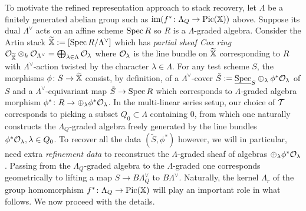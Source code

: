 \documentclass[12pt]{amsart}
\begin{document}
To motivate the refined representation approach to stack recovery, let $\Lambda$ be a finitely generated abelian group such as $\text{im} (f^* \colon \Lambda_Q \to \operatorname{Pic}(\mathbb{X}))$ above. Suppose its dual $\Lambda^{\vee}$ acts on an affine scheme $\operatorname{Spec} R$ so $R$ is a $\Lambda$-graded algebra. Consider the Artin stack $\widetilde{\mathbb{X}}:= [\operatorname{Spec} R/\Lambda^{\vee}]$ which has {\em partial sheaf Cox ring} $\mathcal{O}_{\widetilde{\mathbb{X}}} \otimes_k \mathcal{O}_{\Lambda^{\vee}} = \bigoplus_{\lambda \in \Lambda} \mathcal{O}_{\lambda}$ where $\mathcal{O}_{\lambda}$ is the line bundle on $\widetilde{\mathbb{X}}$ corresponding to $R$ with $\Lambda^{\vee}$-action twisted by the character $\lambda \in \Lambda$. For any test scheme $S$, the morphisms $\phi \colon S \to \widetilde{\mathbb{X}}$ consist, by definition, of a $\Lambda^{\vee}$-cover $\tilde{S} := \underline{\operatorname{Spec}}_S \oplus_{\lambda} \phi^* \mathcal{O}_{\lambda}$ of $S$ and a $\Lambda^{\vee}$-equivariant map $\tilde{S} \to \operatorname{Spec} R$ which corresponds to $\Lambda$-graded algebra morphism $\phi^* \colon R \to \oplus_{\lambda} \phi^* \mathcal{O}_{\lambda}$. In the multi-linear series setup, our choice of $\mathcal{T}$ corresponds to picking a subset $Q_0 \subset \Lambda$ containing $0$, from which one naturally constructs the $\Lambda_Q$-graded algebra freely generated by the line bundles $\phi^*\mathcal{O}_{\lambda}, \lambda \in Q_0$. To recover all the data $(\tilde{S}, \phi^*)$ however, we will in particular, need extra {\em refinement data} to reconstruct the $\Lambda$-graded sheaf of algebras $\oplus_{\lambda} \phi^* \mathcal{O}_{\lambda}$. Passing from the $\Lambda_Q$-graded algebra to the $\Lambda$-graded one corresponds geometrically to lifting a map $S \to B\Lambda_Q^{\vee}$ to $B\Lambda^{\vee}$. Naturally, the kernel $\Lambda_r$ of the group homomorphism $f^* \colon \Lambda_Q \to \operatorname{Pic}(\mathbb{X})$ will play an important role in what follows. We now proceed with the details. 

\end{document}
